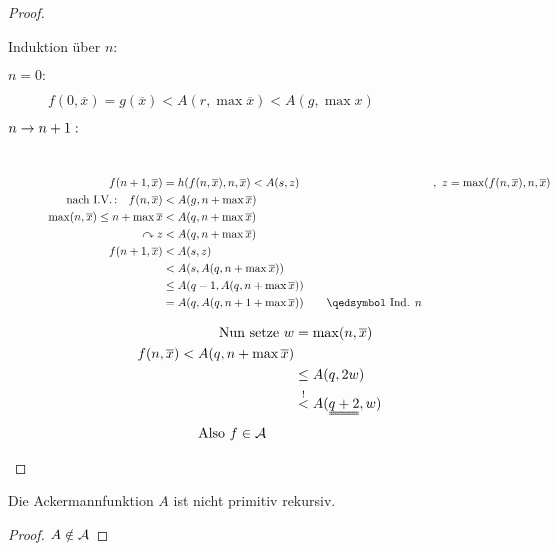 \begin{proof}
\begin{enumerate}
		Induktion über $n$:
		\begin{description}
		\item[$n=0:$]\qquad $f(0,\overline{x}) = g(\overline{x}) < A(r,\max\overline{x}) < A(g,\max x)$
		\item[$n\->n+1:$]\ \vspace{-2em}
			\begin{align*}
				f(n+1,\overline{x}) &= h(f(n,\overline{x}),n,\overline{x}) < A(s,z) &&,\ z=\max(f(n,\overline{x}),n,\overline{x})\\
				\text{nach I.V.\,:}\quad f(n,\overline{x}) &< A(g,n+\max\overline{x})\\
				\max(n,\overline{x}) \leq n+\max\overline{x} &< A(q,n+\max\overline{x})\\
				\curvearrowright z &< A(q,n+\max\overline{x})\\
				f(n+1,\overline{x}) &< A(s,z)\\
				&< A(s,A(q,n+\max\overline{x}))\\
				&\leq A(q-1,A(q,n+\max\overline{x}))\\
				&= A(q,A(q,n+1+\max\overline{x})) \tag*{\qedsymbol\ Ind. $n$}
			\end{align*}
		\end{description}
		\begin{align*}
			\text{Nun setze }w &=\max(n,\overline{x})\\
			f(n,\overline{x}) < A(q,n+\max\overline{x})\\
			&\leq A(q,2w)\\
			&\overset!< A(\uuline{q+2},w)\\
			\text{Also }f\in\A \tag*{\qedhere}
		\end{align*}
	\end{enumerate}
\end{proof}
\begin{Korollar}
	Die Ackermannfunktion $A$ ist nicht primitiv rekursiv.
\end{Korollar}
\begin{proof}
	$A\notin\mathcal{A}$
\end{proof}